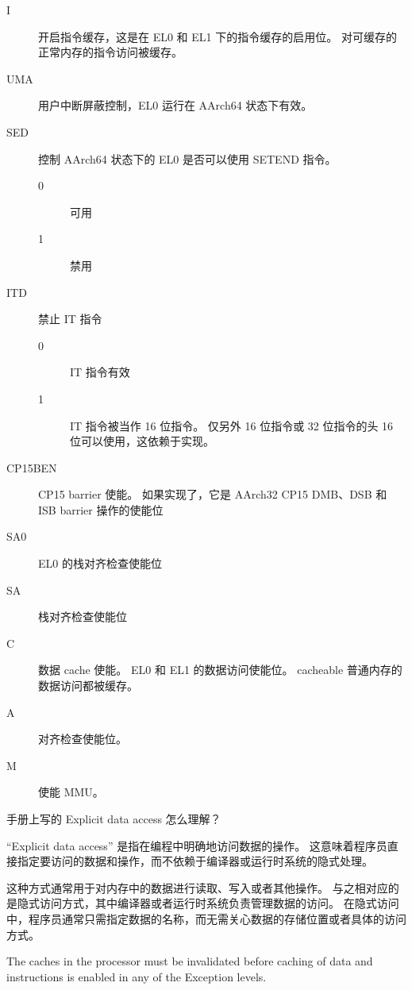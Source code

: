 \begin{description}
  \item[I] 开启指令缓存，这是在 EL0 和 EL1 下的指令缓存的启用位。
    对可缓存的正常内存的指令访问被缓存。
  \item[UMA] 用户中断屏蔽控制，EL0 运行在 AArch64 状态下有效。
  \item[SED] 控制 AArch64 状态下的 EL0 是否可以使用 SETEND 指令。
    \begin{description}
      \item[0] 可用
      \item[1] 禁用
    \end{description}
  \item[ITD] 禁止 IT 指令
    \begin{description}
      \item[0] IT 指令有效
      \item[1] IT 指令被当作 16 位指令。
        仅另外 16 位指令或 32 位指令的头 16 位可以使用，这依赖于实现。
    \end{description}
  \item[CP15BEN] CP15 barrier 使能。
    如果实现了，它是 AArch32 CP15 DMB、DSB 和 ISB barrier 操作的使能位
  \item[SA0] EL0 的栈对齐检查使能位
  \item[SA] 栈对齐检查使能位
  \item[C] 数据 cache 使能。
    EL0 和 EL1 的数据访问使能位。
    cacheable 普通内存的数据访问都被缓存。
  \item[A] 对齐检查使能位。
  \item[M] 使能 MMU。
\end{description}

\begin{probsolu}[title={Problem and Solution \theprob}]{
    手册上写的 Explicit data access 怎么理解？}

  “Explicit data access” 是指在编程中明确地访问数据的操作。
  这意味着程序员直接指定要访问的数据和操作，而不依赖于编译器或运行时系统的隐式处理。

  这种方式通常用于对内存中的数据进行读取、写入或者其他操作。
  与之相对应的是隐式访问方式，其中编译器或者运行时系统负责管理数据的访问。
  在隐式访问中，程序员通常只需指定数据的名称，而无需关心数据的存储位置或者具体的访问方式。

\end{probsolu}

\begin{remark}
  The caches in the processor must be invalidated before caching of data and instructions is
enabled in any of the Exception levels.
\end{remark}

